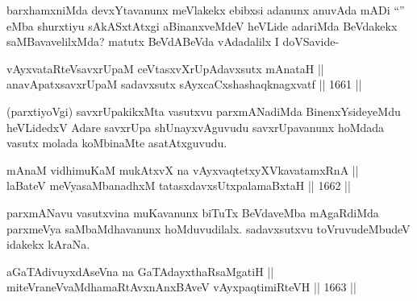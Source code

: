 \begin{artha}
barxhamxniMda devxYtavanunx meVlakekx ebibxsi adanunx anuvAda mADi ``\stext'' eMba shurxtiyu sAkASxtAtxgi aBinanxveMdeV heVLide adariMda BeVdakekx saMBavavelilxMda? matutx BeVdABeVda vAdadalilx I doVSavide-
\end{artha}

\begin{shl}
vAyxvataRteV\s savxrUpaM ceVtasxvXrUpAdavxsutx mAnataH || \\
anavApatxsavxrUpaM sadavxsutx sAyxcaCxshashaqknagxvatf \hfill || 1661 ||  
\end{shl}

\begin{artha}
(parxtiyoVgi) savxrUpakikxMta vasutxvu parxmANadiMda BinenxYsideyeMdu heVLidedxV Adare savxrUpa shUnayxvAguvudu savxrUpavanunx hoMdada vasutx molada koMbinaMte asatAtxguvudu.
\end{artha}


\begin{shl}
mAnaM vidhimuKaM mukAtxvX na vAyxvaqtetxyXVkavatamxRnA || \\
laBateV meVyasaMbanadhxM tatasxdavxsUtxpalamaBxtaH \hfill || 1662 ||  
\end{shl}

\begin{artha}
parxmANavu vasutxvina muKavanunx biTuTx BeVdaveMba mAgaRdiMda parxmeVya saMbaMdhavanunx hoMduvudilalx. sadavxsutxvu toVruvudeMbudeV idakekx kAraNa.
\end{artha} 


\begin{shl}
aGaTAdivuyxdAseVna na GaTAdayxthaRsaMgatiH || \\
miteVraneVvaMdhamaRtAvxnAnxBAveV vAyxpaqtimiRteVH \hfill || 1663 ||  
\end{shl}

